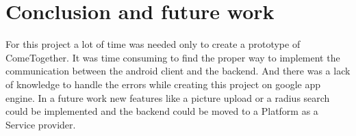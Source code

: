 \section{Conclusion and future work}\label{Conclusion}
For this project a lot of time was needed only to create a prototype of ComeTogether. It was time consuming to find the proper way to implement the communication between the android client and the backend. And there was a lack of knowledge to handle the errors while creating this project on google app engine. In a future work new features like a picture upload or a radius search could be implemented and the backend could be moved to a  Platform as a Service provider.
